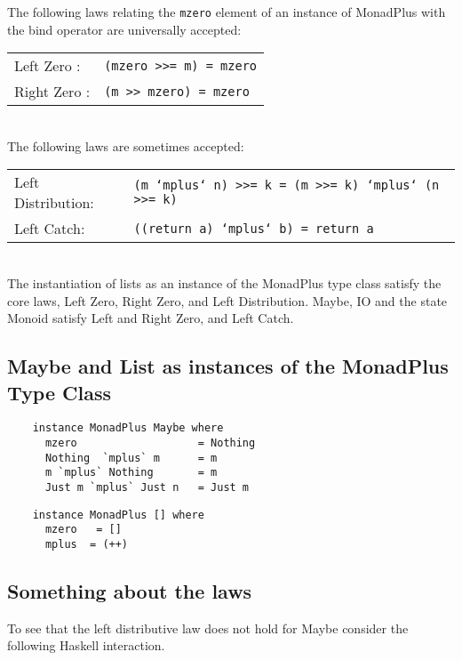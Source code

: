 \documentclass[11pt]{article}
\begin{document}
\noindent{}The following laws relating the {\tt{mzero}} element of an instance
of MonadPlus with the bind operator are universally accepted: \\

\begin{tabular}{ll}
Left Zero : & {\tt{(mzero >>= m)  =  mzero}} \\
Right Zero : & {\tt{(m >> mzero)  =  mzero}} \\
\end{tabular}
\vspace{.125in} \\

\noindent{}The following laws are sometimes accepted:\\

\begin{tabular}{ll}
Left Distribution: & {\tt{(m `mplus` n) >>= k  =  (m >>= k) `mplus` (n >>= k)}}\\
Left Catch: & {\tt{((return a) `mplus` b) = return a}}\\
\end{tabular}
\vspace{.125in} \\
The instantiation of lists as an instance of the MonadPlus type class satisfy
the core laws, Left Zero, Right Zero, and Left Distribution.  Maybe, IO and the
state Monoid satisfy Left and Right Zero, and Left Catch.


\subsection{Maybe and List as instances of the MonadPlus Type Class}

\begin{verbatim}
    instance MonadPlus Maybe where
      mzero                   = Nothing
      Nothing  `mplus` m      = m
      m `mplus` Nothing       = m  
      Just m `mplus` Just n   = Just m
\end{verbatim}

\begin{verbatim}
    instance MonadPlus [] where
      mzero   = []
      mplus  = (++)
\end{verbatim}


\subsection{Something about the laws}

To see that the left distributive law does not hold for Maybe consider the
following Haskell interaction.
\end{document}
